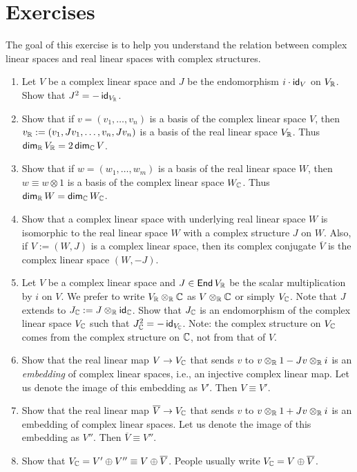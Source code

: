 \clearpage{}

\section{Exercises}

\begin{problem}
The goal of this exercise is to help you understand the relation between complex linear spaces and real linear spaces with complex structures.
\begin{enumerate}
	\item Let $V$ be a complex linear space and $J$ be the endomorphism $i \cdot \id_V$ on $V_{\R}$. Show that $J^2 = - \id_{V_{\R}}$.
	\item Show that if $v = (v_1, \ldots, v_n)$ is a basis of the complex linear space $V$, then $v_{\R} := (v_1, Jv_1, \ldots, v_n, Jv_n)$ is a basis of the real linear space $V_{\R}$. Thus $\dim_{\R} V_{\R} = 2 \dim_{\C} V$.
	\item Show that if $w = (w_1, \ldots, w_m)$ is a basis of the real linear space $W$, then $w \equiv w \otimes 1$ is a basis of the complex linear space $W_{\C}$. Thus $\dim_{\R} W = \dim_{\C} W_{\C}$.
	\item Show that a complex linear space with underlying real linear space $W$ is isomorphic to the real linear space $W$ with a complex structure $J$ on $W$. Also, if $V := (W, J)$ is a complex linear space, then its complex conjugate $\overline{V}$ is the complex linear space $(W, -J)$.
	\item Let $V$ be a complex linear space and $J \in \End V_{\R}$ be the scalar multiplication by $i$ on $V$. We prefer to write $V_{\R} \otimes_{\R} \C$ as $V \otimes_{\R} \C$ or simply $V_{\C}$. Note that $J$ extends to $J_{\C} := J \otimes_{\R} \id_{\C}$. Show that $J_{\C}$ is an endomorphism of the complex linear space $V_{\C}$ such that $J_{\C}^2 = - \id_{V_{\C}}$. Note: the complex structure on $V_{\C}$ comes from the complex structure on $\C$, not from that of $V$.
	\item Show that the real linear map $V \to V_{\C}$ that sends $v$ to $v \otimes_{\R} 1 - J v \otimes_{\R} i$ is an \emph{embedding} of complex linear spaces, i.e., an injective complex linear map. Let us denote the image of this embedding as $V'$. Then $V \equiv V'$.
	\item Show that the real linear map $\overline{V} \to V_{\C}$ that sends $v$ to $v \otimes_{\R} 1 + J v \otimes_{\R} i$ is an embedding of complex linear spaces. Let us denote the image of this embedding as $V''$. Then $\overline{V} \equiv V''$.
	\item Show that $V_{\C} = V' \oplus V'' \equiv V \oplus \overline{V}$. People usually write $V_{\C} = V \oplus \overline{V}$.
\end{enumerate}
\end{problem}

